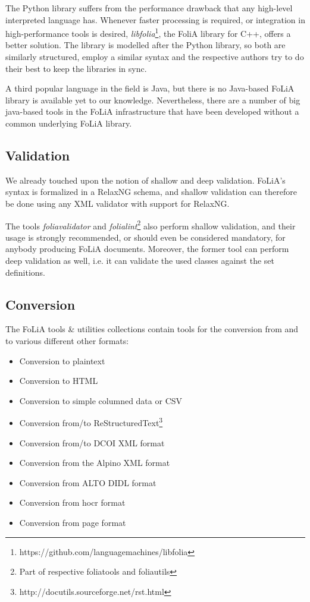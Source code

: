 \documentclass[a4paper,11pt]{article}
\begin{document}
The Python library suffers from the performance drawback that any high-level
interpreted language has. Whenever faster processing is required, or
integration in high-performance tools is desired,
\emph{libfolia}\footnote{https://github.com/languagemachines/libfolia}, the
FoliA library for C++, offers a better solution. The library is modelled after
the Python library, so both are similarly structured, employ a similar syntax
and the respective authors try to do their best to keep the libraries in sync.

A third popular language in the field is Java, but there is no Java-based FoLiA
library is available yet to our knowledge. Nevertheless, there are a number of
big java-based tools in the FoLiA infrastructure that have been developed
without a common underlying FoLiA library.

\subsection{Validation}

We already touched upon the notion of shallow and deep validation.
FoLiA's syntax is formalized in a RelaxNG schema, and shallow validation can
therefore be done using any XML validator with support for RelaxNG. 

The tools \emph{foliavalidator} and \emph{folialint}\footnote{Part of
respective foliatools and foliautils} also perform shallow validation, and
their usage is strongly recommended, or should even be considered mandatory,
for anybody producing FoLiA documents. Moreover, the former tool can perform
deep validation as well, i.e. it can validate the used classes against the set
definitions.

\subsection{Conversion}

The FoLiA tools \& utilities collections contain tools for the conversion from and to
various different other formats:

\begin{itemize}
    \item Conversion to plaintext
    \item Conversion to HTML
    \item Conversion to simple columned data or CSV
    \item Conversion from/to ReStructuredText\footnote{http://docutils.sourceforge.net/rst.html}
    \item Conversion from/to DCOI XML format \cite{DCOI}
    \item Conversion from the Alpino XML format \cite{ALPINO}
    \item Conversion from ALTO DIDL format %
    \item Conversion from hocr format  %
    \item Conversion from page format  %
\end{itemize}
\end{document}
